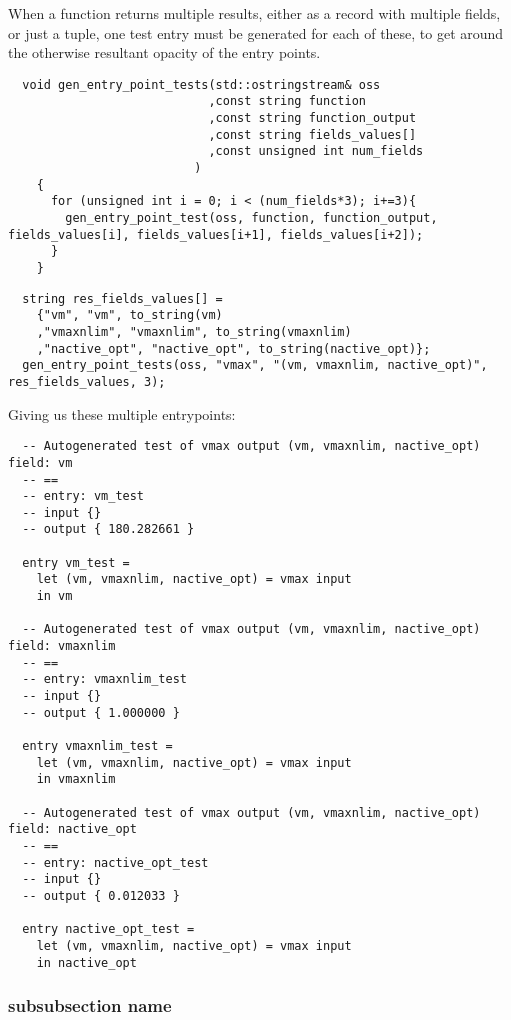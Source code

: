 When a function returns multiple results, either as a record with multiple fields, or just a tuple, one test entry must be generated for each of these, to get around the otherwise resultant opacity of the entry points.

\begin{verbatim}
  void gen_entry_point_tests(std::ostringstream& oss
                            ,const string function
                            ,const string function_output
                            ,const string fields_values[]
                            ,const unsigned int num_fields
                          )
    {
      for (unsigned int i = 0; i < (num_fields*3); i+=3){
        gen_entry_point_test(oss, function, function_output, fields_values[i], fields_values[i+1], fields_values[i+2]);
      }
    }
\end{verbatim}

\begin{verbatim}
  string res_fields_values[] =
    {"vm", "vm", to_string(vm)
    ,"vmaxnlim", "vmaxnlim", to_string(vmaxnlim)
    ,"nactive_opt", "nactive_opt", to_string(nactive_opt)};
  gen_entry_point_tests(oss, "vmax", "(vm, vmaxnlim, nactive_opt)", res_fields_values, 3);
\end{verbatim}

Giving us these multiple entrypoints:

\begin{verbatim}
  -- Autogenerated test of vmax output (vm, vmaxnlim, nactive_opt) field: vm
  -- ==
  -- entry: vm_test
  -- input {}
  -- output { 180.282661 }

  entry vm_test =
    let (vm, vmaxnlim, nactive_opt) = vmax input
    in vm

  -- Autogenerated test of vmax output (vm, vmaxnlim, nactive_opt) field: vmaxnlim
  -- ==
  -- entry: vmaxnlim_test
  -- input {}
  -- output { 1.000000 }

  entry vmaxnlim_test =
    let (vm, vmaxnlim, nactive_opt) = vmax input
    in vmaxnlim

  -- Autogenerated test of vmax output (vm, vmaxnlim, nactive_opt) field: nactive_opt
  -- ==
  -- entry: nactive_opt_test
  -- input {}
  -- output { 0.012033 }

  entry nactive_opt_test =
    let (vm, vmaxnlim, nactive_opt) = vmax input
    in nactive_opt
\end{verbatim}


\subsubsection*{subsubsection name}



